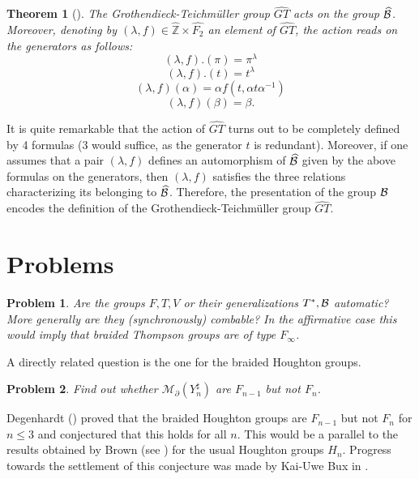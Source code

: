 \documentclass[twoside]{irmaems}
\theoremstyle{plain}
\newtheorem{theorem}{Theorem}[section]
\newtheorem{problem}{Problem}
\theoremstyle{definition}
\theoremstyle{remark}
\newcommand{\Z}{{\mathbb{Z}}}
\newcommand{\B}{{{\cal B}}}
\begin{document}
\begin{theorem}[\cite{ka2}] The Grothendieck-Teichm\"uller group $\widehat{GT}$ acts  
   on the group $\widehat{\B}$. Moreover, denoting by 
   $(\lambda,f)\in \hat{\Z}\times \hat{F_{2}}$ an element of $\widehat{GT}$, 
   the action reads on the generators as follows:
   $$(\lambda,f).(\pi)=\pi^{\lambda}$$
   $$(\lambda,f).(t)=t^{\lambda}$$
   $$(\lambda,f)(\alpha)=\alpha f(t,\alpha t\alpha^{-1})$$
   $$(\lambda,f)(\beta)=\beta.$$
   \end{theorem}

\vspace{0.1cm}\noindent 
 It is quite remarkable that the action of $\widehat{GT}$ 
 turns out to be completely
 defined by 4 formulas (3 would suffice, as the generator $t$ is redundant). Moreover, 
   if one assumes that a pair $(\lambda,f)$ defines an automorphism of $\widehat{\B}$ given by the above formulas on the generators,
   then  $(\lambda,f)$ satisfies the three relations characterizing its belonging to $\widehat{\B}$.
  Therefore, the presentation of the group $\B$ encodes the definition of the Grothendieck-Teichm\"uller group $\widehat{GT}$.
  

\section{Problems}



\begin{problem}
Are the groups $F,T, V$ or their generalizations $T^*, \B$ automatic? 
More generally are they (synchronously) combable? In the affirmative 
case this would imply that braided Thompson groups are of type $F_{\infty}$. 
\end{problem}


\vspace{0.1cm}\noindent 
A directly related question is the one for the braided Houghton groups. 

\begin{problem}
Find out whether ${\mathcal M}_{\partial}(Y_n^{\sharp})$ 
are $F_{n-1}$ but not $F_n$.
\end{problem}

\vspace{0.1cm}\noindent 
Degenhardt (\cite{Deg}) proved that the braided Houghton groups 
are $F_{n-1}$ but not $F_n$ for $n\leq 3$ and conjectured that this holds for 
all $n$. This would be a parallel to the results obtained by Brown  
(see \cite{br1}) for the usual Houghton groups $H_n$.  
Progress towards the settlement of this conjecture was made 
by Kai-Uwe Bux in \cite{Bux}. 
\end{document}
